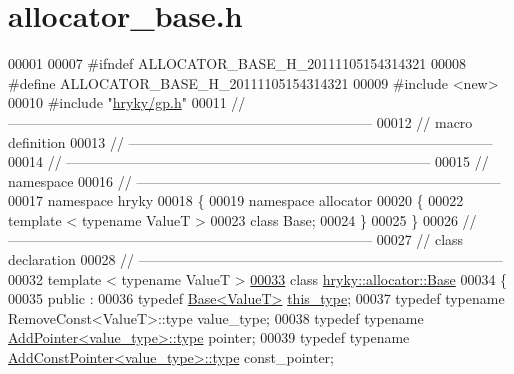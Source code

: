 \hypertarget{allocator__base_8h_source}{\section{allocator\-\_\-base.\-h}
}

\begin{DoxyCode}
00001 
00007 \textcolor{preprocessor}{#ifndef ALLOCATOR\_BASE\_H\_20111105154314321}
00008 \textcolor{preprocessor}{}\textcolor{preprocessor}{#define ALLOCATOR\_BASE\_H\_20111105154314321}
00009 \textcolor{preprocessor}{}\textcolor{preprocessor}{#include <new>}
00010 \textcolor{preprocessor}{#include "\hyperlink{gp_8h}{hryky/gp.h}"}
00011 \textcolor{comment}{//
      ------------------------------------------------------------------------------}
00012 \textcolor{comment}{// macro definition}
00013 \textcolor{comment}{//
      ------------------------------------------------------------------------------}
00014 \textcolor{comment}{//
      ------------------------------------------------------------------------------}
00015 \textcolor{comment}{// namespace}
00016 \textcolor{comment}{//
      ------------------------------------------------------------------------------}
00017 \textcolor{keyword}{namespace }hryky
00018 \{
00019 \textcolor{keyword}{namespace }allocator
00020 \{
00022     \textcolor{keyword}{template} < \textcolor{keyword}{typename} ValueT >
00023     \textcolor{keyword}{class }Base;
00024 \}
00025 \}
00026 \textcolor{comment}{//
      ------------------------------------------------------------------------------}
00027 \textcolor{comment}{// class declaration}
00028 \textcolor{comment}{//
      ------------------------------------------------------------------------------}
00032 \textcolor{comment}{}\textcolor{keyword}{template} < \textcolor{keyword}{typename} ValueT >
\hypertarget{allocator__base_8h_source_l00033}{}\hyperlink{classhryky_1_1allocator_1_1_base}{00033} \textcolor{keyword}{class }\hyperlink{classhryky_1_1allocator_1_1_base}{hryky::allocator::Base}
00034 \{
00035 \textcolor{keyword}{public} :
00036     \textcolor{keyword}{typedef} \hyperlink{classhryky_1_1allocator_1_1_base}{Base<ValueT>}                                    \hyperlink{classhryky_1_1allocator_1_1_base}{this_type};
00037     \textcolor{keyword}{typedef} \textcolor{keyword}{typename} RemoveConst<ValueT>::type              value\_type;
00038     \textcolor{keyword}{typedef} \textcolor{keyword}{typename} \hyperlink{classhryky_1_1_add_pointer}{AddPointer<value_type>::type}           pointer;
00039     \textcolor{keyword}{typedef} \textcolor{keyword}{typename} \hyperlink{classhryky_1_1_add_const_pointer_a62e5c44fefac145f6bd2460e4c8d0ba2}{AddConstPointer<value_type>::type}      const\_pointer;

\end{DoxyCode}
